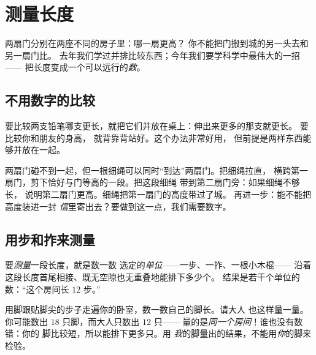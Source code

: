 \chapter{测量长度}\label{ch:g2:measuring-length}

两扇门分别在两座不同的房子里：哪一扇更高？
你不能把门搬到城的另一头去和另一扇门比。
去年我们学过并排比较东西；今年我们要学科学中最伟大的一招——
把长度变成一个可以远行的\emph{数}。

\section{不用数字的比较}

\begin{example}[并排比较]\label{ex:g2:measuring-length:sidebyside}
要比较两支铅笔哪支更长，就把它们并放在桌上：伸出来更多的那支就更长。
要比较你和朋友的身高，
就背靠背站好。这个办法非常好用，
但前提是两样东西能够并放在一起。
\end{example}

\begin{example}[细绳的办法]\label{ex:g2:measuring-length:string}
两扇门碰不到一起，但一根细绳可以同时“到达”两扇门。把细绳拉直，
横跨第一扇门，剪下恰好与门等高的一段。把这段细绳
带到第二扇门旁：如果细绳不够长，
说明第二扇门更高。细绳把第一扇门的高度带过了城。
再进一步：能不能把高度装进一封
\emph{信}里寄出去？要做到这一点，我们需要数字。
\end{example}

\section{用步和拃来测量}

\begin{definition}[测量长度]\label{def:g2:measuring-length:measure}
要\emph{测量}一段长度，就是数一数
选定的\emph{单位}——一步、一拃、一根小木棍——
沿着这段长度首尾相接、既无空隙也无重叠地能排下多少个。
结果是若干个单位的数：“这个房间长 $12$ 步。”
\end{definition}

\begin{example}\label{ex:g2:measuring-length:pace}
用脚跟贴脚尖的步子走遍你的卧室，数一数自己的脚长。请大人
也这样量一量。你可能数出 $18$ 只脚，而大人只数出 $12$ 只——
量的是\emph{同一个房间}！谁也没有数错：你的
脚比较短，所以能排下更多只。用
\emph{我}的脚量出的结果，不能用\emph{你}的脚来检验。
\end{example}

